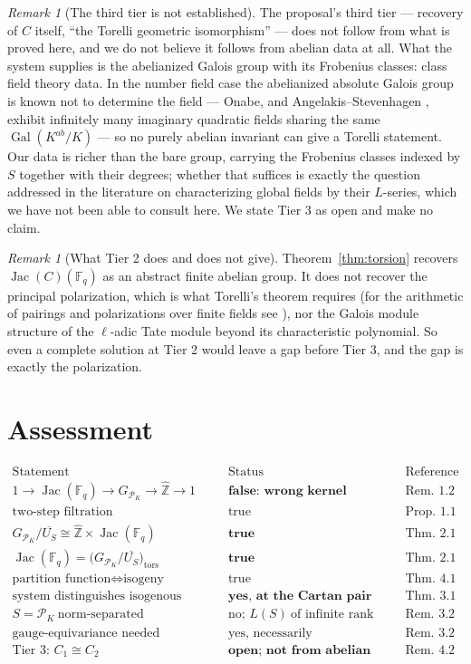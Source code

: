 \documentclass[11pt]{amsart}
\numberwithin{equation}{section}
\theoremstyle{definition}
\theoremstyle{remark}
\newtheorem{remark}[theorem]{Remark}
\newcommand{\Z}{\mathbb{Z}}
\newcommand{\F}{\mathbb{F}}
\newcommand{\hZ}{\widehat{\Z}}
\newcommand{\cP}{\mathcal{P}}
\newcommand{\Jac}{\operatorname{Jac}}
\newcommand{\Gal}{\operatorname{Gal}}
\newcommand{\tors}{\mathrm{tors}}
\begin{document}
\begin{remark}[The third tier is not established]\label{rem:tier3}
The proposal's third tier --- recovery of $C$ itself, ``the Torelli geometric isomorphism'' ---
does not follow from what is proved here, and we do not believe it follows from abelian data
at all. What the system supplies is the abelianized Galois group with its Frobenius classes:
class field theory data. In the number field case the abelianized absolute Galois group is
known not to determine the field --- Onabe, and Angelakis--Stevenhagen \cite{AS}, exhibit infinitely
many imaginary quadratic fields sharing the same $\Gal(K^{ab}/K)$ --- so no purely abelian
invariant can give a Torelli statement. Our data is richer than the bare group, carrying the
Frobenius classes indexed by $S$ together with their degrees; whether that suffices is
exactly the question addressed in the literature on characterizing global fields by their
$L$-series, which we have not been able to consult here. We state Tier 3 as open and make no
claim.
\end{remark}

\begin{remark}[What Tier 2 does and does not give]\label{rem:tier2limits}
Theorem~\ref{thm:torsion} recovers $\Jac(C)(\F_q)$ as an abstract finite abelian group. It
does not recover the principal polarization, which is what Torelli's theorem requires (for
the arithmetic of pairings and polarizations over finite fields see \cite{Howe}), nor
the Galois module structure of the $\ell$-adic Tate module beyond its characteristic
polynomial. So even a complete solution at Tier 2 would leave a gap before Tier 3, and the
gap is exactly the polarization.
\end{remark}

\section{Assessment}

\[
\begin{array}{lll}
\text{Statement} & \text{Status} & \text{Reference}\\\hline
1\to\Jac(\F_q)\to G_{\cP_K}\to\hZ\to1 & \textbf{false: wrong kernel} & \text{Rem.~1.2}\\
\text{two-step filtration} & \text{true} & \text{Prop.~1.1}\\
G_{\cP_K}/\overline{U_S}\cong\hZ\times\Jac(\F_q) & \textbf{true} & \text{Thm.~2.1}\\
\Jac(\F_q)=\bigl(G_{\cP_K}/\overline{U_S}\bigr)_{\tors} & \textbf{true} & \text{Thm.~2.1}\\
\text{partition function}\iff\text{isogeny} & \text{true} & \text{Thm.~4.1}\\
\text{system distinguishes isogenous curves} & \textbf{yes, at the Cartan pair} & \text{Thm.~3.1}\\
S=\cP_K\ \text{norm-separated} & \text{no; }L(S)\ \text{of infinite rank} & \text{Rem.~3.2}\\
\text{gauge-equivariance needed} & \text{yes, necessarily} & \text{Rem.~3.2}\\
\text{Tier 3: }C_1\cong C_2 & \textbf{open; not from abelian data} & \text{Rem.~4.2}
\end{array}
\]
\end{document}
